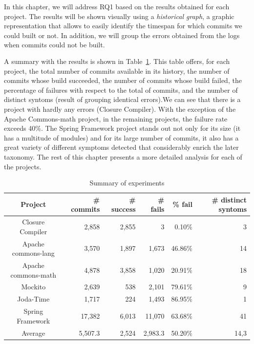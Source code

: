 In this chapter, we will address RQ1 based on the results obtained for each project.
The results will be shown visually using a \emph{historical graph}, a graphic representation that allows to easily identify the timespan for which commits we could built or not.
In addition, we will group the errors obtained from the logs when commits could not be built.

A summary with the results is shown in Table~\ref{table:allResults}.
This table offers, for each project, the total number of commits available in its history, the number of commits whose build succeeded, the number of commits whose build failed, the percentage of failures with respect to the total of commits, and the number of distinct syntoms (result of grouping identical errors).We can see that there is a project with hardly any errors (Closure Compiler). With the exception of the Apache Commons-math project, in the remaining projects, the failure rate exceeds 40\%. The Spring Framework project stands out not only for its size (it has a multitude of modules) and for its large number of commits, it also has a great variety of different symptoms detected that considerably enrich the later taxonomy.
The rest of this chapter presents a more detailed analysis for each of the projects.

\begin{table}[h]
	\caption{Summary of experiments}
	\label{table:allResults}
	\begin{center}
	\begin{tabular}{crrrrr}
		\toprule
		\bf{Project} & \bf{\# commits} & \bf{\# success} & \bf{\# fails} & \bf{\% fail} & \bf{\# distinct syntoms}\\ 
		\midrule
		Closure Compiler & 2,858 & 2,855 & 3 & 0.10\% & 3\\
		Apache commons-lang & 3,570 & 1,897 & 1,673 & 46.86\% & 14\\
		Apache commons-math & 4,878 & 3,858 & 1,020 & 20.91\% & 18 \\
		Mockito & 2,639 & 538 & 2,101 & 79.61\% & 9 \\
		Joda-Time & 1,717 & 224 & 1,493 & 86.95\% & 1 \\
		Spring Framework & 17,382 & 6,013 & 11,070 & 63.68\% & 41\\
		\midrule
		Average & 5,507.3 & 2,524 & 2,983.3 & 50.20\% & 14,3 \\
		\bottomrule
	\end{tabular}
	\end{center}
\end{table}

